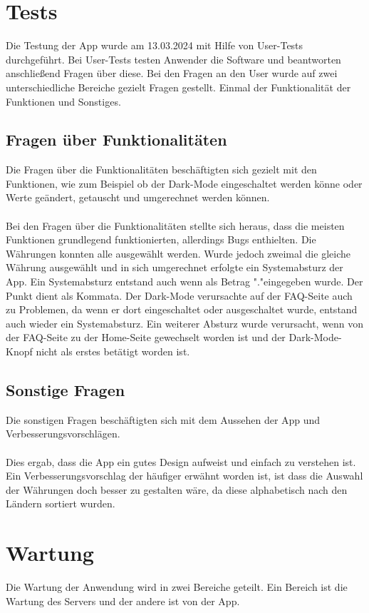 \documentclass[conference]{IEEEtran}
\begin{document}
\section{Tests}
Die Testung der App wurde am 13.03.2024 mit Hilfe von User-Tests durchgeführt. Bei User-Tests testen Anwender die Software und beantworten anschließend Fragen über diese. Bei den Fragen an den User wurde auf zwei unterschiedliche Bereiche gezielt Fragen gestellt. Einmal der Funktionalität der Funktionen und Sonstiges.

\subsection{Fragen über Funktionalitäten}
Die Fragen über die Funktionalitäten beschäftigten sich gezielt mit den Funktionen, wie zum Beispiel ob der Dark-Mode eingeschaltet werden könne oder Werte geändert, getauscht und umgerechnet werden können. \\\\ Bei den Fragen über die Funktionalitäten stellte sich heraus, dass die meisten Funktionen grundlegend funktionierten, allerdings Bugs enthielten. Die Währungen konnten alle ausgewählt werden. Wurde jedoch zweimal die gleiche Währung ausgewählt und in sich umgerechnet erfolgte ein Systemabsturz der App. Ein Systemabsturz entstand auch wenn als Betrag "."\space eingegeben wurde. Der Punkt dient als Kommata. Der Dark-Mode verursachte auf der FAQ-Seite auch zu Problemen, da wenn er dort eingeschaltet oder ausgeschaltet wurde, entstand auch wieder ein Systemabsturz. Ein weiterer Absturz wurde verursacht, wenn von der FAQ-Seite zu der Home-Seite gewechselt worden ist und der Dark-Mode-Knopf nicht als erstes betätigt worden ist.

\subsection{Sonstige Fragen}
Die sonstigen Fragen beschäftigten sich mit dem Aussehen der App und Verbesserungsvorschlägen. \\\\ Dies ergab, dass die App ein gutes Design aufweist und einfach zu verstehen ist. Ein Verbesserungsvorschlag der häufiger erwähnt worden ist, ist dass die Auswahl der Währungen doch besser zu gestalten wäre, da diese alphabetisch nach den Ländern sortiert wurden.

\section{Wartung}
Die Wartung der Anwendung wird in zwei Bereiche geteilt. Ein Bereich ist die Wartung des Servers und der andere ist von der App.
\end{document}
